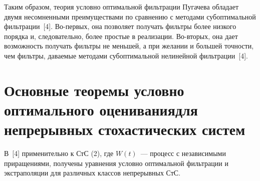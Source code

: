 \begin{multicols}{2}
Таким образом, теория условно оптимальной фильтрации Пугачева
обладает двумя несомненными преимуществами по сравнению с методами
субоптимальной фильтрации~[4]. Во-первых, она позволяет получать
фильтры более низкого порядка и, следовательно, более простые в
реализации. Во-вторых, она дает возможность получать фильтры не
меньшей, а при желании и большей точности, чем фильтры, даваемые
методами субоптимальной нелинейной фильтрации~[4].

\section{Основные теоремы условно оптимального
 оценивания\newline для непрерывных стохастических систем}

В~[4] применительно к СтС (2), где  $W(t)$~--- процесс с независимыми
приращениями, получены уравнения условно оптимальной фильтрации и
экстраполяции для различных классов непрерывных СтС.


\end{multicols}

